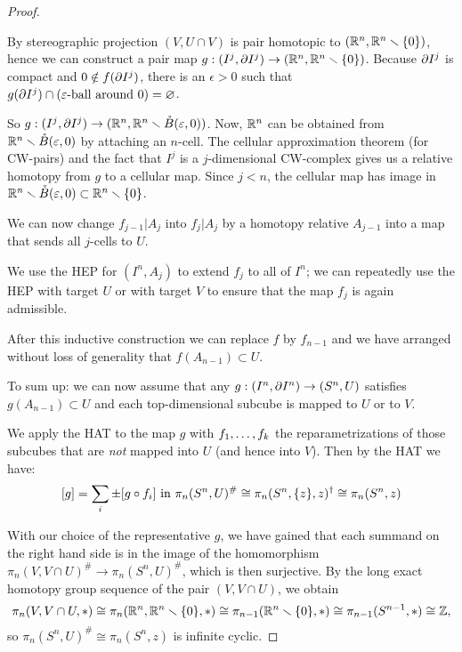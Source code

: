\begin{proof}
\begin{claimproof}
By stereographic projection $(V,U\cap V)$ is pair homotopic to $({\mathbb R}^n,{\mathbb R}^n\smallsetminus\{0\})$, hence we can construct a pair map $g:(I^j,\partial I^j)\to ({\mathbb R}^n,{\mathbb R}^n\smallsetminus\{0\})$. Because $\partial I^j$ is compact and $0\notin f(\partial I^j)$, there is an $\epsilon>0$ such that $g(\partial I^j)\cap(\varepsilon\text{-ball around }0)=\varnothing$.

So $g:(I^j,\partial I^j)\to({\mathbb R}^n,{\mathbb R}^n\smallsetminus\mathring B(\varepsilon,0))$. Now, ${\mathbb R}^n$ can be obtained from ${\mathbb R}^n\smallsetminus\mathring B(\varepsilon,0)$ by attaching an $n$-cell. The cellular approximation theorem (for CW-pairs) and the fact that $I^j$ is a $j$-dimensional CW-complex gives us a relative homotopy from $g$ to a cellular map. Since $j<n$, the cellular map has image in ${\mathbb R}^n\smallsetminus\mathring B(\varepsilon,0)\subset{\mathbb R}^n\smallsetminus\{0\}$.
\end{claimproof}

We can now change $f_{j-1}|A_j$ into $f_j|A_j$ by a homotopy relative $A_{j-1}$ into a map that sends all $j$-cells to $U$.

We use the HEP for $(I^n,A_j)$ to extend $f_j$ to all of $I^n$; we can repeatedly use the HEP with target $U$ or with target $V$ to ensure that the map $f_j$ is again admissible.

After this inductive construction we can replace $f$ by $f_{n-1}$ and we have arranged without loss of generality that $f(A_{n-1})\subset U$.

To sum up: we can now assume that any $g:(I^n,\partial I^n)\to(S^n,U)$ satisfies $g(A_{n-1})\subset U$ and each top-dimensional subcube is mapped to $U$ or to $V$.

We apply the HAT to the map $g$ with ${{f}_1,\dots,{f}_{k}}$ the reparametrizations of those subcubes that are \textit{not} mapped into $U$ (and hence into $V$). Then by the HAT we have:
\[[g]=\sum_i\pm[g\circ f_i]\text{ in }\pi_n(S^n,U)^\#\cong\pi_n(S^n,\{z\},z)^\dagger\cong\pi_n(S^n,z)\]

With our choice of the representative $g$, we have gained that each summand on the right hand side is in the image of the homomorphism $\pi_n(V,V\cap U)^\#\to\pi_n(S^n,U)^\#$, which is then surjective. By the long exact homotopy group sequence of the pair $(V,V\cap U)$, we obtain
\[\pi_n(V,V\cap U,*)\cong\pi_n({\mathbb R}^n,{\mathbb R}^n\smallsetminus\{0\},*)\cong\pi_{n-1}({\mathbb R}^n\smallsetminus\{0\},*)\cong\pi_{n-1}(S^{n-1},*)\cong{\mathbb Z},\]
so $\pi_n(S^n,U)^\#\cong\pi_n(S^n,z)$ is infinite cyclic.
\end{proof}

